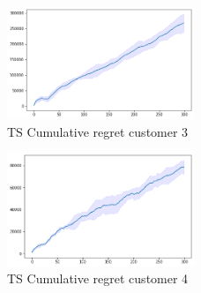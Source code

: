 \begin{multicols}{2}
    \begin{figure}[H]
        \begin{center}
        \includegraphics[width=0.5\textwidth]{img/ts7_3cum_reg.png}
        \caption{TS Cumulative regret customer 3}
        \label{fig:Cum_reg73}
        \end{center}
    \end{figure}
    \columnbreak
    \begin{figure}[H]
        \begin{center}
        \includegraphics[width=0.5\textwidth]{img/ts7_4cum_reg.png}
        \caption{TS Cumulative regret customer 4}
        \label{fig:Cum_reg74}
        \end{center}
    \end{figure}
\end{multicols}

